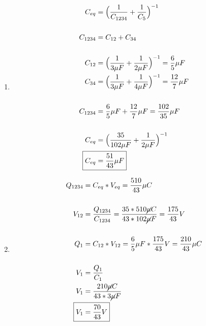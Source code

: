 \documentclass[10pt, twoside]{article}
\begin{document}
	\begin{enumerate}[label=\alph*.]
		\item
			\begin{align*}
				C_{eq} &= \Big{(} \frac{1}{C_{1234}}+ \frac{1}{C_5}  \Big{)}^{-1}\\
				\\
				C_{1234} &= C_{12}+C_{34}\\
				\\
				C_{12} &= \Big{(} \frac{1}{3\mu F} + \frac{1}{2\mu F} \Big{)}^{-1} = \frac{6}{5}\mu F\\
				C_{34} &= \Big{(} \frac{1}{3\mu F} + \frac{1}{4\mu F} \Big{)}^{-1} = \frac{12}{7}\mu F\\
				\\
				C_{1234} &= \frac{6}{5} \mu F + \frac{12}{7} \mu F = \frac{102}{35} \mu F\\
				\\
				C_{eq} &= \Big{(} \frac{35}{102\mu F}+ \frac{1}{2\mu F}  \Big{)}^{-1}\\
				\Aboxed
				{
					C_{eq} &= \frac{51}{43} \mu F
				}
			\end{align*}
		\item
			\begin{align*}
				Q_{1234} &= C_{eq}*V_{eq} = \frac{510}{43} \mu C\\
				\\
				V_{12} &= \frac{Q_{1234}}{C_{1234}}
				= \frac{35*510\cancel{\mu} C}{43*102\cancel{\mu} F}
				=\frac{175}{43}V\\
				\\
				Q_1 &= C_{12}*V_{12}
				= \frac{6}{5} \mu F* \frac{175}{43} V
				= \frac{210}{43} \mu C\\
				\\
				V_1 &= \frac{Q_1}{C_1} \\
				V_1 &= \frac{210\cancel{\mu} C}{43*3\cancel{\mu} F}\\
				\Aboxed
				{
					V_1 &= \frac{70}{43} V
				}
			\end{align*}
	\end{enumerate}
	\noindent\makebox[\linewidth]{\rule{\paperwidth}{0.4pt}}
\end{document}
